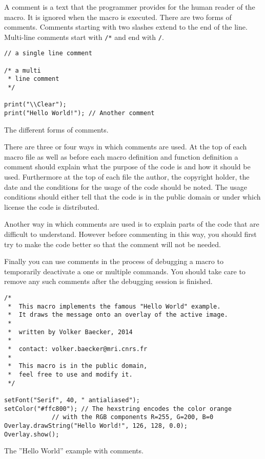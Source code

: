 A comment is a text that the programmer provides for the human reader of the macro. It is ignored when the macro is executed. There are two forms of comments. Comments starting with two slashes extend to the end of the line. Multi-line comments start with {\tt /*} and end with {\tt */}.

\begin{listing}[H]
\begin{verbatim}
// a single line comment

/* a multi
 * line comment
 */

print("\\Clear");
print("Hello World!"); // Another comment
\end{verbatim}
\caption{The different forms of comments.}
\label{lst:forms_of_comments}
\end{listing}

There are three or four ways in which comments are used. At the top of each macro file as well as before each macro definition and function definition a comment should explain what the purpose of the code is and how it should be used. Furthermore at the top of each file the author, the copyright holder, the date and the conditions for the usage of the code should be noted. The usage conditions should either tell that the code is in the public domain or under which license the code is distributed. 

Another way in which comments are used is to explain parts of the code that are difficult to understand. However before commenting in this way, you should first try to make the code better so that the comment will not be needed. 

Finally you can use comments in the process of debugging a macro to temporarily deactivate a one or multiple commands. You should take care to remove any such comments after the debugging session is finished.

\begin{listing}[H]
\begin{verbatim}
/*
 *  This macro implements the famous "Hello World" example.
 *  It draws the message onto an overlay of the active image. 
 *  
 *  written by Volker Baecker, 2014
 *  
 *  contact: volker.baecker@mri.cnrs.fr
 *  
 *  This macro is in the public domain, 
 *  feel free to use and modify it.
 */
 
setFont("Serif", 40, " antialiased");
setColor("#ffc800"); // The hexstring encodes the color orange
		     // with the RGB components R=255, G=200, B=0
Overlay.drawString("Hello World!", 126, 128, 0.0);
Overlay.show();
\end{verbatim}
\caption{The ''Hello World'' example with comments.}
\label{lst:hello_world__with_comments}
\end{listing}

